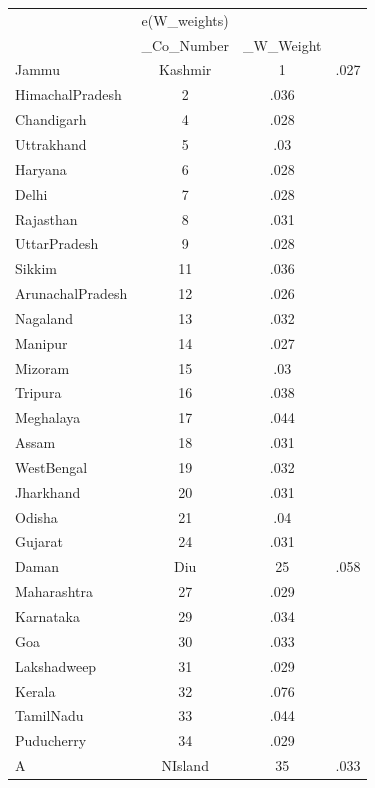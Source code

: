 \begin{tabular}{l*{2}{c}}
\hline\hline
            &e(W\_weights)&            \\
            &  \_Co\_Number&   \_W\_Weight\\
\hline
Jammu&Kashmir&           1&        .027\\
HimachalPradesh&           2&        .036\\
Chandigarh  &           4&        .028\\
Uttrakhand  &           5&         .03\\
Haryana     &           6&        .028\\
Delhi       &           7&        .028\\
Rajasthan   &           8&        .031\\
UttarPradesh&           9&        .028\\
Sikkim      &          11&        .036\\
ArunachalPradesh&          12&        .026\\
Nagaland    &          13&        .032\\
Manipur     &          14&        .027\\
Mizoram     &          15&         .03\\
Tripura     &          16&        .038\\
Meghalaya   &          17&        .044\\
Assam       &          18&        .031\\
WestBengal  &          19&        .032\\
Jharkhand   &          20&        .031\\
Odisha      &          21&         .04\\
Gujarat     &          24&        .031\\
Daman&Diu   &          25&        .058\\
Maharashtra &          27&        .029\\
Karnataka   &          29&        .034\\
Goa         &          30&        .033\\
Lakshadweep &          31&        .029\\
Kerala      &          32&        .076\\
TamilNadu   &          33&        .044\\
Puducherry  &          34&        .029\\
A&NIsland   &          35&        .033\\
\hline\hline
\end{tabular}
